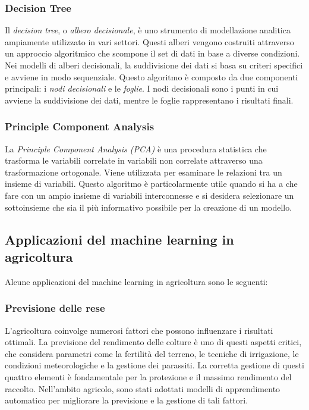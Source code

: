 \subsubsection{Decision Tree}

Il \textit{decision tree}, o \textit{albero decisionale}, è uno strumento di modellazione analitica ampiamente utilizzato in vari settori. Questi alberi vengono costruiti attraverso un approccio algoritmico che scompone il set di dati in base a diverse condizioni. Nei modelli di alberi decisionali, la suddivisione dei dati si basa su criteri specifici e avviene in modo sequenziale. Questo algoritmo è composto da due componenti principali: i \textit{nodi decisionali} e le \textit{foglie}. I nodi decisionali sono i punti in cui avviene la suddivisione dei dati, mentre le foglie rappresentano i risultati finali. 

\subsubsection{Principle Component Analysis}

La \textit{Principle Component Analysis (PCA)} è una procedura statistica che trasforma le variabili correlate in variabili non correlate attraverso una trasformazione ortogonale. Viene utilizzata per esaminare le relazioni tra un insieme di variabili. Questo algoritmo è particolarmente utile quando si ha a che fare con un ampio insieme di variabili interconnesse e si desidera selezionare un sottoinsieme che sia il più informativo possibile per la creazione di un modello. 

\subsection{Applicazioni del machine learning in agricoltura}

Alcune applicazioni del machine learning in agricoltura sono le seguenti:

\subsubsection{Previsione delle rese}

L'agricoltura coinvolge numerosi fattori che possono influenzare i risultati ottimali. La previsione del rendimento delle colture è uno di questi aspetti critici, che considera parametri come la fertilità del terreno, le tecniche di irrigazione, le condizioni meteorologiche e la gestione dei parassiti. La corretta gestione di questi quattro elementi è fondamentale per la protezione e il massimo rendimento del raccolto. Nell'ambito agricolo, sono stati adottati modelli di apprendimento automatico per migliorare la previsione e la gestione di tali fattori.

